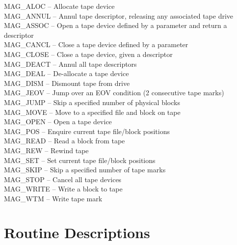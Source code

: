 \begin{latexonly}
MAG\_ALOC --   Allocate tape device \\
MAG\_ANNUL --   Annul tape descriptor, releasing any associated tape drive \\
MAG\_ASSOC --   Open a tape device defined by a parameter and return a descriptor \\
MAG\_CANCL --   Close a tape device defined by a parameter\\
MAG\_CLOSE --   Close a tape device, given a descriptor \\
MAG\_DEACT --   Annul all tape descriptors \\
MAG\_DEAL --   De-allocate a tape device \\
MAG\_DISM --   Dismount tape from drive \\
MAG\_JEOV --   Jump over an EOV condition (2 consecutive tape marks) \\
MAG\_JUMP --   Skip a specified number of physical blocks \\
MAG\_MOVE --   Move to a specified file and block on tape \\
MAG\_OPEN --   Open a tape device \\
MAG\_POS --   Enquire current tape file/block positions \\
MAG\_READ --   Read a block from tape \\
MAG\_REW --   Rewind tape \\
MAG\_SET --   Set current tape file/block positions \\
MAG\_SKIP --   Skip a specified number of tape marks \\
MAG\_STOP --   Cancel all tape devices \\
MAG\_WRITE --   Write a block to tape \\
MAG\_WTM --   Write tape mark
\end{latexonly}

\newpage
\section{Routine Descriptions}


